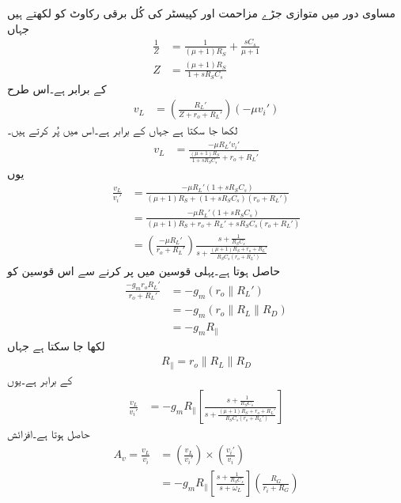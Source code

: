 مساوی دور میں متوازی جڑے مزاحمت اور کپیسٹر کی کُل برقی رکاوٹ کو  لکھتے ہیں جہاں
\begin{align*}
\frac{1}{Z}&=\frac{1}{\left(\mu+1 \right)R_S}+\frac{s C_s}{\mu+1}\\
Z&=\frac{\left(\mu+1 \right)R_S}{1+s R_S C_s}
\end{align*}
کے برابر ہے۔اس طرح
\begin{align*}
v_L&=\left(\frac{R_L'}{Z +r_o +R_L'}\right) \left(-\mu v_i' \right)
\end{align*}
لکھا جا سکتا ہے جہاں  کے برابر ہے۔اس میں  پُر کرتے ہیں۔
\begin{align*}
v_L&=\frac{-\mu R_L' v_i'}{\frac{\left(\mu+1 \right)R_S}{1+s R_S C_s} +r_o +R_L'}
\end{align*}
یوں
\begin{align*}
\frac{v_L}{v_i'}&=\frac{-\mu R_L' \left(1+s R_S C_s \right)}{\left(\mu+1 \right)R_S +\left(1+s R_S C_s \right)\left(r_o +R_L'\right)}\\
&=\frac{-\mu R_L' \left(1+s R_S C_s \right)}{\left(\mu+1 \right)R_S +r_o +R_L'+s R_S C_s \left(r_o +R_L'\right)}\\
&=\left(\frac{-\mu R_L'}{r_o+R_L'}\right)\frac{s+\frac{1}{ R_S C_s}}{s+\frac{\left(\mu+1 \right)R_S +r_o +R_L'}{R_S C_s \left(r_o +R_L'\right)}}
\end{align*}
حاصل ہوتا ہے۔پہلی قوسین  میں  پر کرنے سے اس قوسین کو
\begin{align*}
\frac{-g_m r_o R_L'}{r_o+R_L'}&=-g_m \left(r_o\mathbin{\|} R_L' \right)\\
&=-g_m \left(r_o\mathbin{\|} R_L \mathbin{\|} R_D \right)\\
&= -g_m R_{\mathbin{\|}}
\end{align*}
لکھا جا سکتا ہے جہاں
\begin{align*}
R_{\mathbin{\|}}=r_o\mathbin{\|} R_L \mathbin{\|} R_D
\end{align*}
کے برابر ہے۔یوں
\begin{align*}
\frac{v_L}{v_i'}&=-g_m R_{\mathbin{\|}}\left[\frac{s+\frac{1}{ R_S C_s}}{s+\frac{\left(\mu+1 \right)R_S +r_o +R_L'}{R_S C_s \left(r_o +R_L'\right)}}\right]
\end{align*}
حاصل ہوتا ہے۔افزائش
\begin{align}\label{مساوات_تعدد_ردعمل_افزائش_ماسفیٹ_مخارج_کپیسٹر}
A_v =\frac{v_L}{v_i}&=\left(\frac{v_L}{v_i'}\right) \times \left(\frac{v_i'}{v_i}\right)\\
&=-g_m R_{\mathbin{\|}}\left[\frac{s+\frac{1}{ R_S C_s}}{s+\omega_L}\right] \left(\frac{R_G}{r_i+R_G} \right)
\end{align}
